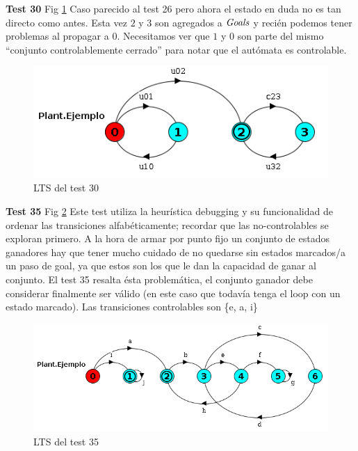 \smallskip
\textbf{Test 30} Fig \ref{fig:test30} 
Caso parecido al test 26 pero ahora el estado en duda no es tan directo como antes. Esta vez $2$ y $3$ son agregados a $\mathit{Goals}$ y recién podemos tener problemas al propagar a $0$. Necesitamos ver que $1$ y $0$ son parte del mismo ``conjunto controlablemente cerrado'' para notar que el autómata es controlable. %
\begin{figure}[h]
 \centering
 \includegraphics[scale=0.7]{figures/tests/test30.png}
 \caption{LTS del test 30}
 \label{fig:test30}
\end{figure}

\smallskip
\textbf{Test 35} Fig \ref{fig:test35} 
Este test utiliza la heurística debugging y su funcionalidad de ordenar las transiciones alfabéticamente; recordar que las no-controlables se exploran primero. A la hora de armar por punto fijo un conjunto de estados ganadores hay que tener mucho cuidado de no quedarse sin estados marcados/a un paso de goal, ya que estos son los que le dan la capacidad de ganar al conjunto. El test 35 resalta ésta problemática, el conjunto ganador debe considerar finalmente ser válido (en este caso que todavía tenga el loop con un estado marcado).  Las transiciones controlables son \{e, a, i\}
\begin{figure}[h]
 \centering
 \includegraphics[scale=0.7]{figures/tests/test35.png}
 \caption{LTS del test 35}
 \label{fig:test35}
\end{figure}

